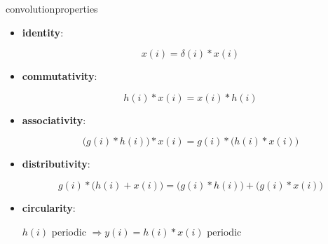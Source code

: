         \begin{frame}{convolution}{properties}
            \begin{itemize}
                \item<1->	\textbf{identity}:
                        \begin{footnotesize}\begin{equation*}
                            x(i) = \delta(i)\ast x(i)
                        \end{equation*}\end{footnotesize}
                \item<2->	\textbf{commutativity}: 
                        \begin{footnotesize}\begin{equation*}
                            h(i) \ast x(i)	= x(i) \ast h(i) 
                        \end{equation*}\end{footnotesize}
                \item<3->	\textbf{associativity}:
                        \begin{footnotesize}\begin{equation*}
                            \big(g(i) \ast h(i)\big) \ast x(i) = g(i) \ast \big(h(i) \ast x(i)\big)
                        \end{equation*}\end{footnotesize}
                \item<4->	\textbf{distributivity}:
                            \begin{footnotesize}\begin{equation*}
                                g(i) \ast \big(h(i) + x(i)\big) = \big(g(i) \ast h(i)\big) + \big(g(i) \ast x(i)\big)
                            \end{equation*}\end{footnotesize}
                \item<5->	\textbf{circularity}:\\
                        \begin{footnotesize}
                        $h(i)$ periodic $\Rightarrow y(i) = h(i) \ast x(i)$ periodic
                        \end{footnotesize}
            \end{itemize}
        \end{frame}

